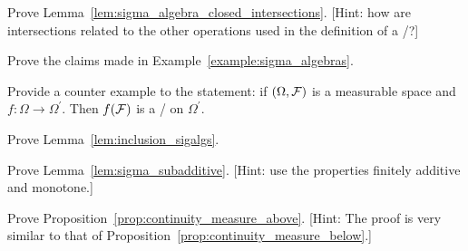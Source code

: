 \begin{problem}\label{prb:sigma_algebra_closed_intersections}
Prove Lemma~\ref{lem:sigma_algebra_closed_intersections}. [Hint: how are intersections related to the other operations used in the definition of a \sigalg/?]
\end{problem}

\begin{problem}\label{prb:example_sigalgs}
Prove the claims made in Example~\ref{example:sigma_algebras}.
\end{problem}

\begin{problem}\label{prb:converse_preimage_sigma_algebra}
Provide a counter example to the statement: if $(\Omega, \mathcal F)$ is a measurable space and $f : \Omega \to \Omega^\prime$. Then $f(\mathcal F)$ is a \sigalg/ on $\Omega^\prime$.
\end{problem}

\begin{problem}\label{prb:inclusion_sigalgs}
Prove Lemma~\ref{lem:inclusion_sigalgs}.
\end{problem}

\begin{problem}\label{prb:sigma_subadditive}
Prove Lemma~\ref{lem:sigma_subadditive}. [Hint: use the properties finitely additive and monotone.] 
\end{problem}

\begin{problem}\label{prb:proof_continuity_above}
Prove Proposition~\ref{prop:continuity_measure_above}. [Hint: The proof is very similar to that of Proposition~\ref{prop:continuity_measure_below}.]
\end{problem}

